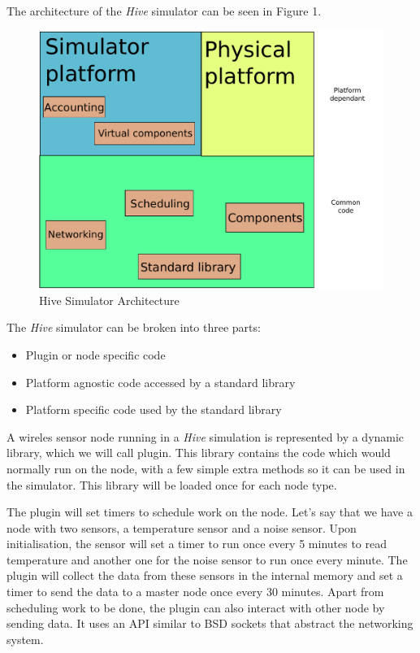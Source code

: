 
The architecture of the \textit{Hive} simulator can be seen in Figure 1.

\begin{figure}[htb]
  \begin{center}
    \includegraphics[scale=0.75]{img/bigarch.pdf}
    \caption{Hive Simulator Architecture}
  \end{center}
\end{figure}

The \textit{Hive} simulator can be broken into three parts:
\begin{itemize}
  \item Plugin or node specific code
  \item Platform agnostic code accessed by a standard library
  \item Platform specific code used by the standard library
\end{itemize}

A wireles sensor node running in a \textit{Hive} simulation is 
represented by a dynamic library, which we will call plugin. This library contains the code 
which would normally run on the node, with a few simple extra methods
so it can be used in the simulator. This library will be loaded once
for each node type.

The plugin will set timers to schedule work on the node. Let's say that we have
a node with two sensors, a temperature sensor and a noise sensor. Upon
initialisation, the sensor will set a timer to run once every 5 minutes to
read temperature and another one for the noise sensor to run once every
minute. The plugin will collect the data from these sensors in the internal memory
and set a timer to send the data to a master node once every 30 minutes.
Apart from scheduling work to be done, the plugin can also interact with other
node by sending data. It uses an API similar to BSD sockets that abstract the
networking system.

